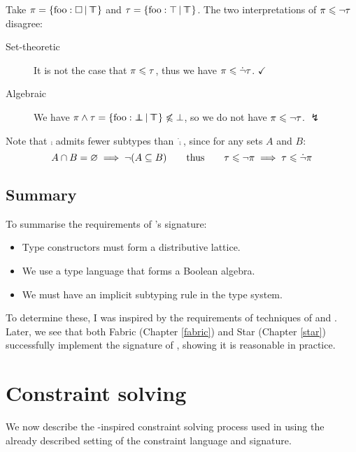 \begin{example}
    Take $\pi = \flext{\mathrm{foo}: \flabsent }{\flftop}$ and $\tau = \flext{\mathrm{foo}: \top}{\flftop}$. The two interpretations of $\pi \leqslant \lnot \tau$ disagree: \begin{description}
        \item[Set-theoretic] It is not the case that $\pi \leqslant \tau$, thus we have $\pi \leqslant \dot {\lnot} \tau$. $\checkmark$
        \item[Algebraic] We have $\pi \meet \tau = \flext{\mathrm{foo} : \flfbot }{\flftop} \not\sub \bot$, so we do not have $\pi \leqslant \lnot \tau$. $\lightning$
    \end{description}
    Note that $\comp$ admits fewer subtypes than $\dot \comp$, since for any sets $A$ and $B$: 
    $$A \cap B = \varnothing \implies \lnot(A \subseteq B) \qquad\text{thus}\qquad \tau \leqslant \lnot \pi \implies \tau \leqslant \dot{\lnot} \pi $$ 
\end{example}

\subsection{Summary} To summarise the requirements of \inference{}'s signature: \begin{itemize}
    \item Type constructors must form a distributive lattice.
    \item We use a type language that forms a Boolean algebra.
    \item We must have an implicit subtyping rule in the type system.
\end{itemize} 
To determine these, I was inspired by the requirements of techniques of \textcite{mlsub} and \textcite{mlstruct}.
Later, we see that both Fabric (Chapter \ref{fabric}) and Star (Chapter \ref{star}) successfully implement the signature of \inference{}, showing it is reasonable in practice.

\section{Constraint solving}
\label{sec:constraints}

We now describe the \mlstruct{}-inspired constraint solving process used in \inference{} using the already described setting of the constraint language and signature. 

